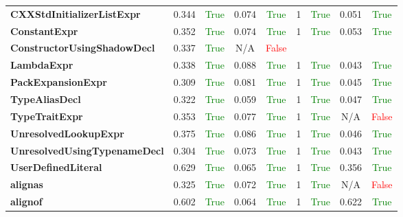 \documentclass{article}
\begin{document}
\begin{xltabular}{\textwidth}{lcccccccc}
\textbf{{\fontsize{10}{12}\selectfont CXXStdInitializerListExpr}}& 0.344&\textcolor{green}{True}& 0.074&\textcolor{green}{True}& 1&\textcolor{green}{True}& 0.051&\textcolor{green}{True} \\[0.5ex]
\textbf{{\fontsize{10}{12}\selectfont ConstantExpr}}& 0.352&\textcolor{green}{True}& 0.074&\textcolor{green}{True}& 1&\textcolor{green}{True}& 0.053&\textcolor{green}{True} \\[0.5ex]
\textbf{{\fontsize{10}{12}\selectfont ConstructorUsingShadowDecl}}& 0.337&\textcolor{green}{True}& N/A&\textcolor{red}{False} \\[0.5ex]
\textbf{{\fontsize{10}{12}\selectfont LambdaExpr}}& 0.338&\textcolor{green}{True}& 0.088&\textcolor{green}{True}& 1&\textcolor{green}{True}& 0.043&\textcolor{green}{True} \\[0.5ex]
\textbf{{\fontsize{10}{12}\selectfont PackExpansionExpr}}& 0.309&\textcolor{green}{True}& 0.081&\textcolor{green}{True}& 1&\textcolor{green}{True}& 0.045&\textcolor{green}{True} \\[0.5ex]
\textbf{{\fontsize{10}{12}\selectfont TypeAliasDecl}}& 0.322&\textcolor{green}{True}& 0.059&\textcolor{green}{True}& 1&\textcolor{green}{True}& 0.047&\textcolor{green}{True} \\[0.5ex]
\textbf{{\fontsize{10}{12}\selectfont TypeTraitExpr}}& 0.353&\textcolor{green}{True}& 0.077&\textcolor{green}{True}& 1&\textcolor{green}{True}& N/A&\textcolor{red}{False} \\[0.5ex]
\textbf{{\fontsize{10}{12}\selectfont UnresolvedLookupExpr}}& 0.375&\textcolor{green}{True}& 0.086&\textcolor{green}{True}& 1&\textcolor{green}{True}& 0.046&\textcolor{green}{True} \\[0.5ex]
\textbf{{\fontsize{10}{12}\selectfont UnresolvedUsingTypenameDecl}}& 0.304&\textcolor{green}{True}& 0.073&\textcolor{green}{True}& 1&\textcolor{green}{True}& 0.043&\textcolor{green}{True} \\[0.5ex]
\textbf{{\fontsize{10}{12}\selectfont UserDefinedLiteral}}& 0.629&\textcolor{green}{True}& 0.065&\textcolor{green}{True}& 1&\textcolor{green}{True}& 0.356&\textcolor{green}{True} \\[0.5ex]
\textbf{{\fontsize{10}{12}\selectfont alignas}}& 0.325&\textcolor{green}{True}& 0.072&\textcolor{green}{True}& 1&\textcolor{green}{True}& N/A&\textcolor{red}{False} \\[0.5ex]
\textbf{{\fontsize{10}{12}\selectfont alignof}}& 0.602&\textcolor{green}{True}& 0.064&\textcolor{green}{True}& 1&\textcolor{green}{True}& 0.622&\textcolor{green}{True} \\[0.5ex]

\end{xltabular}
\end{document}
